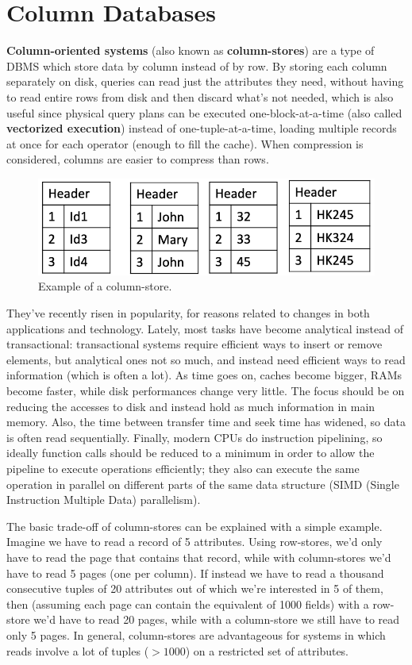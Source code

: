 \chapter{Column Databases}

\textbf{Column-oriented systems} (also known as \textbf{column-stores}) are a type of DBMS which store data by column instead of by row. By storing each column separately on disk, queries can read just the attributes they need, without having to read entire rows from disk and then discard what's not needed, which is also useful since physical query plans can be executed one-block-at-a-time (also called \textbf{vectorized execution}) instead of one-tuple-at-a-time, loading multiple records at once for each operator (enough to fill the cache). When compression is considered, columns are easier to compress than rows.
\begin{figure}[h]
    \centering
    \includegraphics[width=0.5\linewidth]{img/column-store.png}
    \caption{Example of a column-store.}
    \label{fig:column-store}
\end{figure}

They've recently risen in popularity, for reasons related to changes in both applications and technology. Lately, most tasks have become analytical instead of transactional: transactional systems require efficient ways to insert or remove elements, but analytical ones not so much, and instead need efficient ways to read information (which is often a lot). As time goes on, caches become bigger, RAMs become faster, while disk performances change very little. The focus should be on reducing the accesses to disk and instead hold as much information in main memory. Also, the time between transfer time and seek time has widened, so data is often read sequentially. Finally, modern CPUs do instruction pipelining, so ideally function calls should be reduced to a minimum in order to allow the pipeline to execute operations efficiently; they also can execute the same operation in parallel on different parts of the same data structure (SIMD (Single Instruction Multiple Data) parallelism).

The basic trade-off of column-stores can be explained with a simple example. Imagine we have to read a record of 5 attributes. Using row-stores, we'd only have to read the page that contains that record, while with column-stores we'd have to read 5 pages (one per column). If instead we have to read a thousand consecutive tuples of 20 attributes out of which we're interested in 5 of them, then (assuming each page can contain the equivalent of 1000 fields) with a row-store we'd have to read 20 pages, while with a column-store we still have to read only 5 pages. In general, column-stores are advantageous for systems in which reads involve a lot of tuples ($> 1000$) on a restricted set of attributes.

